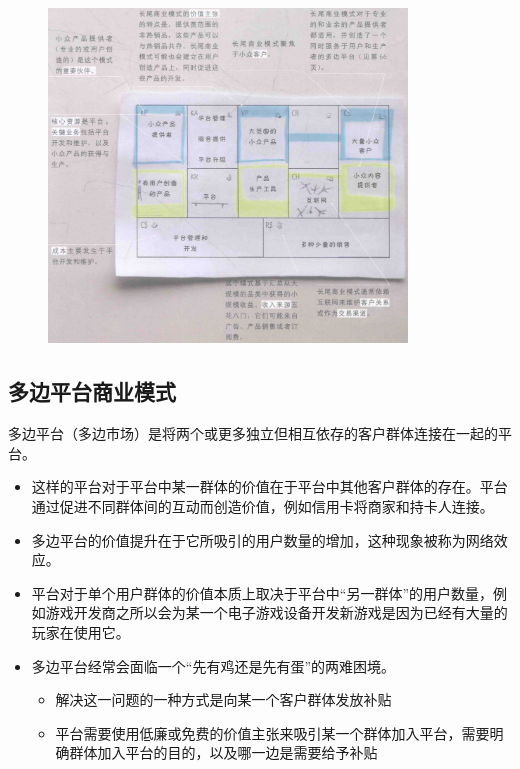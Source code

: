     \begin{figure}[H]
		\centering
        \vspace{-0.5em}
		\includegraphics[width=0.85\textwidth]{img/长尾模式总结.png}
        \vspace{-0.5em}
	\end{figure}

    \subsection{多边平台商业模式}
    多边平台（多边市场）是将两个或更多独立但相互依存的客户群体连接在一起的平台。
    \begin{itemize}
        \item 这样的平台对于平台中某一群体的价值在于平台中其他客户群体的存在。平台通过促进不同群体间的互动而创造价值，例如信用卡将商家和持卡人连接。
        \item 多边平台的价值提升在于它所吸引的用户数量的增加，这种现象被称为网络效应。
        \item 平台对于单个用户群体的价值本质上取决于平台中“另一群体”的用户数量，例如游戏开发商之所以会为某一个电子游戏设备开发新游戏是因为已经有大量的玩家在使用它。
        \item 多边平台经常会面临一个“先有鸡还是先有蛋”的两难困境。
        \begin{itemize}
            \item 解决这一问题的一种方式是向某一个客户群体发放补贴
            \item 平台需要使用低廉或免费的价值主张来吸引某一个群体加入平台，需要明确群体加入平台的目的，以及哪一边是需要给予补贴
        \end{itemize}
    \end{itemize}

